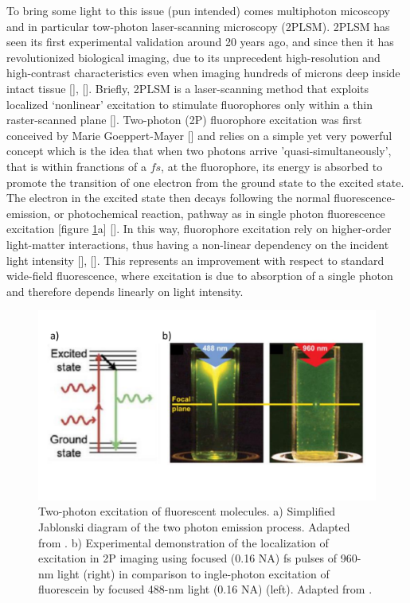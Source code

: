 To bring some light to this issue (pun intended) comes multiphoton micoscopy and in particular tow-photon laser-scanning microscopy (2PLSM).
2PLSM has seen its first experimental validation around 20 years ago, and since then it has revolutionized biological imaging, due to its unprecedent high-resolution and high-contrast characteristics even when imaging hundreds of microns deep inside intact tissue [\cite{denk1994}], [\cite{helmchen2005}].
Briefly, 2PLSM is a laser-scanning method that exploits localized ‘nonlinear’ excitation to stimulate fluorophores only within a thin raster-scanned plane [\cite{zipfel2003}]. 
Two-photon (2P) fluorophore excitation was first conceived by Marie Goeppert-Mayer [\cite{goppertmayer1931}] and relies on a simple yet very powerful concept which is the idea that when two photons arrive 'quasi-simultaneously', that is within franctions of a $fs$, at the fluorophore, its energy is absorbed to promote the transition of one electron from the ground state to the excited state.
The electron in the excited state then decays following the normal fluorescence-emission, or photochemical reaction, pathway as in single photon fluorescence excitation [figure \ref{fig:chap1:optical_imaging}a] [\cite{pawley2006}].
In this way, fluorophore excitation rely on higher-order light-matter interactions, thus having a non-linear dependency on the incident light intensity [\cite{svoboda2006}], [\cite{helmchen2005}]. 
This represents an improvement with respect to standard wide-field fluorescence, where excitation is due to absorption of a single photon and therefore depends linearly on light intensity. 
\begin{figure}
    \centering
    \includegraphics[width=\textwidth]{Figures/Chapter1/intro_fig_optical_imaging.pdf}
    \caption{Two-photon excitation of fluorescent molecules. a) Simplified Jablonski diagram of the two photon emission process. Adapted from \cite{svoboda2006}. b) Experimental demonstration of the localization of excitation in 2P imaging using focused (0.16 NA) fs pulses of 960-nm light (right) in comparison to ingle-photon excitation of fluorescein by focused 488-nm light (0.16 NA) (left). Adapted from \cite{zipfel2003}.}
    \label{fig:chap1:optical_imaging}
\end{figure}
